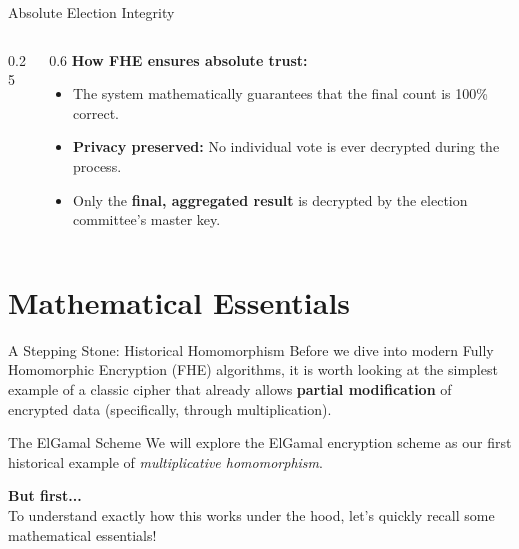 \documentclass[aspectratio=169, 10pt]{beamer}
\begin{document}
\begin{frame}{Absolute Election Integrity}
\begin{columns}
\begin{column}{0.25\textwidth}
{
            }
        \end{column}
        
        \begin{column}{0.6\textwidth}
            \textbf{How FHE ensures absolute trust:}
            \begin{itemize}
                \item The system mathematically guarantees that the final count is 100\% correct.
                \item \textbf{Privacy preserved:} No individual vote is ever decrypted during the process.
                \item Only the \textbf{final, aggregated result} is decrypted by the election committee's master key.
            \end{itemize}
        \end{column}
    \end{columns}
\end{frame}

\section{Mathematical Essentials}

\begin{frame}{A Stepping Stone: Historical Homomorphism}
    Before we dive into modern Fully Homomorphic Encryption (FHE) algorithms, it is worth looking at the simplest example of a classic cipher that already allows \textbf{partial modification} of encrypted data (specifically, through multiplication).
    
    \vspace{0.4cm}
    \begin{block}{The ElGamal Scheme}
        We will explore the ElGamal encryption scheme as our first historical example of \textit{multiplicative homomorphism}.
    \end{block}
    
    \vspace{0.4cm}
    \textbf{But first...}\\
    To understand exactly how this works under the hood, let's quickly recall some mathematical essentials!
\end{frame}
\end{document}
